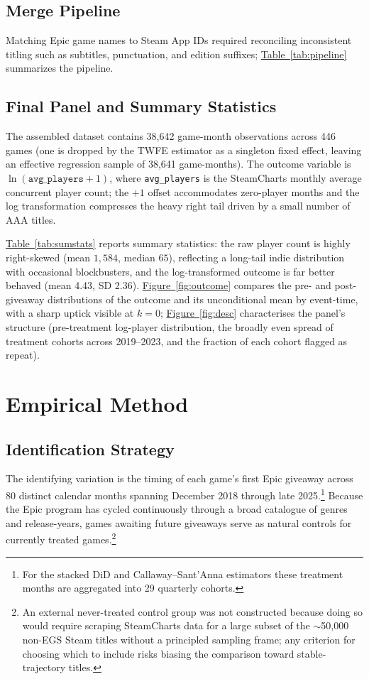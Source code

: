 \documentclass[11pt]{article}
\newcommand{\avgp}{\texttt{avg\_players}}
\newcommand{\tabref}[1]{\hyperref[#1]{Table~\ref*{#1}}}
\newcommand{\figref}[1]{\hyperref[#1]{Figure~\ref*{#1}}}
\begin{document}
\subsection{Merge Pipeline}

Matching Epic game names to Steam App IDs required reconciling inconsistent
titling such as subtitles, punctuation, and edition suffixes; \tabref{tab:pipeline}
summarizes the pipeline.

\subsection{Final Panel and Summary Statistics}

The assembled dataset contains 38{,}642 game-month observations across 446
games (one is dropped by the TWFE estimator as a singleton fixed effect,
leaving an effective regression sample of 38{,}641 game-months).
The outcome variable is $\ln(\avgp+1)$, where \avgp{}
is the SteamCharts monthly average concurrent player count; the $+1$ offset
accommodates zero-player months and the log transformation compresses the heavy
right tail driven by a small number of AAA titles.

\tabref{tab:sumstats} reports summary statistics: the raw player count is
highly right-skewed (mean $1{,}584$, median $65$), reflecting a long-tail indie
distribution with occasional blockbusters, and the log-transformed outcome is
far better behaved (mean 4.43, SD 2.36). \figref{fig:outcome} compares the
pre- and post-giveaway distributions of the outcome and its unconditional mean
by event-time, with a sharp uptick visible at $k = 0$; \figref{fig:desc}
characterises the panel's structure (pre-treatment log-player distribution,
the broadly even spread of treatment cohorts across 2019--2023, and the
fraction of each cohort flagged as repeat).

\section{Empirical Method}
\label{sec:method}

\subsection{Identification Strategy}

The identifying variation is the timing of each game's first Epic giveaway
across 80 distinct calendar months spanning December 2018 through late
2025.\footnote{For the stacked DiD and Callaway--Sant'Anna estimators these
treatment months are aggregated into 29 quarterly cohorts.} Because the Epic program has cycled continuously through a broad
catalogue of genres and release-years, games awaiting future giveaways serve as
natural controls for currently treated games.\footnote{An external never-treated
control group was not constructed because doing so would require scraping
SteamCharts data for a large subset of the $\sim$50{,}000 non-EGS Steam titles
without a principled sampling frame; any criterion for choosing which to include
risks biasing the comparison toward stable-trajectory titles.}
\end{document}
